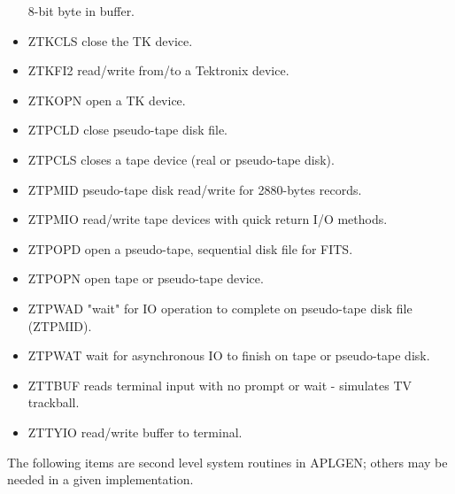 \begin{itemize}
8-bit byte in buffer.
\item ZTKCLS  close the TK device.
\item ZTKFI2  read/write from/to a Tektronix device.
\item ZTKOPN  open a TK device.
\item ZTPCLD  close pseudo-tape disk file.
\item ZTPCLS  closes a tape device (real or pseudo-tape
disk).
\item ZTPMID  pseudo-tape disk read/write for 2880-bytes
records.
\item ZTPMIO  read/write tape devices with quick return
I/O methods.
\item ZTPOPD  open a pseudo-tape, sequential disk file
for FITS.
\item ZTPOPN  open tape or pseudo-tape device.
\item ZTPWAD  "wait" for IO operation to complete on
pseudo-tape disk file (ZTPMID).
\item ZTPWAT  wait for asynchronous IO to finish on tape
or pseudo-tape disk.
\item ZTTBUF  reads terminal input with no prompt or
wait - simulates TV trackball.
\item ZTTYIO  read/write buffer to terminal.

\end{itemize} %

The following items are second level system routines in APLGEN;
others may be needed in a given implementation.

